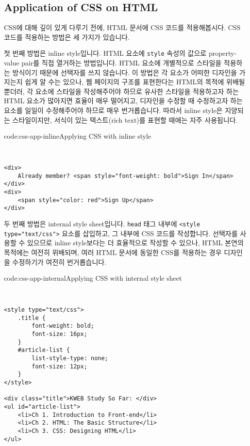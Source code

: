 \subsection*{Application of CSS on HTML}
CSS에 대해 깊이 있게 다루기 전에, HTML 문서에 CSS 코드를 적용해봅시다. CSS 코드를 적용하는 방법은 세 가지가 있습니다. 

첫 번째 방법은 inline style입니다. HTML 요소에 \verb|style| 속성의 값으로 property-value pair를 직접 열거하는 방법입니다. HTML 요소에 개별적으로 스타일을 적용하는 방식이기 때문에 선택자를 쓰지 않습니다. 이 방법은 각 요소가 어떠한 디자인을 가지는지 쉽게 알 수는 있으나, 웹 페이지의 구조를 표현한다는 HTML의 목적에 위배될뿐더러, 각 요소에 스타일을 작성해주어야 하므로 유사한 스타일을 적용하고자 하는 HTML 요소가 많아지면 효율이 매우 떨어지고, 디자인을 수정할 때 수정하고자 하는 요소를 일일이 수정해주어야 하므로 매우 번거롭습니다. 따라서 inline style은 지양되는 스타일이지만, 서식이 있는 텍스트(rich text)를 표현할 때에는 자주 사용됩니다. 

\begin{codeenv}{code:css-app-inline}{Applying CSS with inline style}\begin{verbatim}


<div>
    Already member? <span style="font-weight: bold">Sign In</span>
</div>
<div>
    <span style="color: red">Sign Up</span>
</div>
\end{verbatim}
\end{codeenv}

두 번째 방법은 internal style sheet입니다. \verb|head| 태그 내부에 \verb|<style type="text/css">| 요소를 삽입하고, 그 내부에 CSS 코드를 작성합니다. 선택자를 사용할 수 있으므로 inline style보다는 더 효율적으로 작성할 수 있으나, HTML 본연의 목적에는 여전히 위배되며, 여러 HTML 문서에 동일한 CSS를 적용하는 경우 디자인을 수정하기가 여전히 번거롭습니다. 

\begin{codeenv}{code:css-app-internal}{Applying CSS with internal style sheet}\begin{verbatim}


<style type="text/css">
    .title {
        font-weight: bold;
        font-size: 16px;
    }
    #article-list {
        list-style-type: none;
        font-size: 12px;
    }
</style>

<div class="title">KWEB Study So Far: </div>
<ul id="article-list">
    <li>Ch 1. Introduction to Front-end</li>
    <li>Ch 2. HTML: The Basic Structure</li>
    <li>Ch 3. CSS: Designing HTML</li>
</ul>
\end{verbatim}
\end{codeenv}


